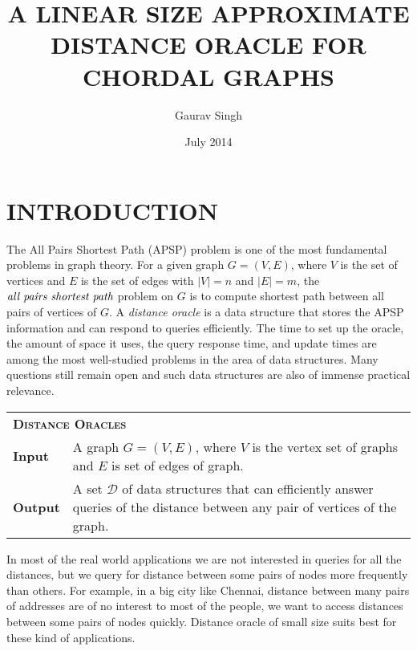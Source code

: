 \documentclass[MS,synopsis]{iitmdiss}
\newcommand\problemfontbold[1]{\large {\textbf{\textsc{#1}}}}
\begin{document}

\title{\MakeUppercase{A Linear Size Approximate Distance Oracle for Chordal Graphs}}
\author{Gaurav Singh}
\date{July 2014}

\maketitle
{}
\setcounter{page}{0}


 \section{INTRODUCTION}
 The All Pairs Shortest Path (APSP) problem is one of the most fundamental problems in graph theory.
 For a given graph $G = (V,E)$, where $V$ is the set of vertices and $E$ is the
 set of edges with $|V| = n$ and $|E| = m$, the $\emph{all pairs shortest path}$
 problem on $G$ is to compute shortest path between all pairs of vertices of $G$.  
 A {\em distance oracle} is a data structure that stores the APSP information and can respond to queries efficiently.   
 The time to set up the oracle, the amount of space it uses, the query response time,
 and update times are among the most well-studied problems in the area of data structures.   
 Many questions still remain open and such data structures are also of immense practical relevance.
 
\begin{tabular}{ll} 
 \multicolumn{ 2}{l}{\problemfontbold{Distance Oracles}} \\
 \textbf{Input} & \begin{minipage}[t]{0.8\columnwidth}
 A graph $G = (V,E)$, where $V$ is the vertex set of graphs and $E$ is set of edges of graph.
 \end{minipage} \\
 \textbf{Output} & \begin{minipage}[t]{0.8\columnwidth}
 A set $\mathcal{D}$ of data structures that can efficiently answer queries of the distance between any pair of vertices of the graph.
 \end{minipage}
 \\
 \end{tabular}
 
 In most of the real world applications we are not interested in queries for all the
 distances, but we query for distance between some pairs of nodes more frequently than others. 
 For example, in a big city like Chennai, distance between many pairs of
 addresses are of no interest to most of the people, we want to access distances between some pairs of nodes 
 quickly. Distance oracle of small size suits best for these kind of applications. 
 
\end{document}
